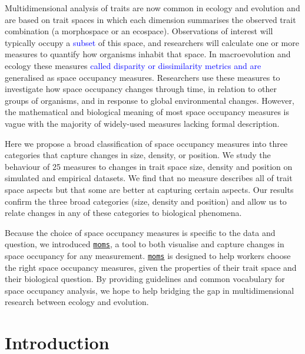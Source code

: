 \documentclass[]{article}
\begin{document}
Multidimensional analysis of traits are now common in ecology and
evolution and are based on trait spaces in which each dimension
summarises the observed trait combination (a morphospace or an
ecospace). Observations of interest will typically occupy a
\textcolor{blue}{subset} of this space, and
researchers will calculate one or more measures to quantify how
organisms inhabit that space. In macroevolution and ecology these
measures \textcolor{blue}{called disparity or
dissimilarity metrics and are} generalised as space occupancy measures.
Researchers use these measures to investigate how space occupancy
changes through time, in relation to other groups of organisms, and in
response to global environmental changes. However, the mathematical and
biological meaning of most space occupancy measures is vague with the
majority of widely-used measures lacking formal description.

Here we propose a broad classification of space occupancy measures into
three categories that capture changes in size, density, or position. We
study the behaviour of 25 measures to changes in trait space size,
density and position on simulated and empirical datasets. We find that
no measure describes all of trait space aspects but that some are better
at capturing certain aspects. Our results confirm the three broad
categories (size, density and position) and allow us to relate changes
in any of these categories to biological phenomena.

Because the choice of space occupancy measures is specific to the data
and question, we introduced
\href{https://tguillerme.shinyapps.io/moms/}{\texttt{moms}}, a tool to
both visualise and capture changes in space occupancy for any
measurement. \href{https://tguillerme.shinyapps.io/moms/}{\texttt{moms}}
is designed to help workers choose the right space occupancy measures,
given the properties of their trait space and their biological question.
By providing guidelines and common vocabulary for space occupancy
analysis, we hope to help bridging the gap in multidimensional research
between ecology and evolution.

\section{Introduction}\label{introduction}
\end{document}
